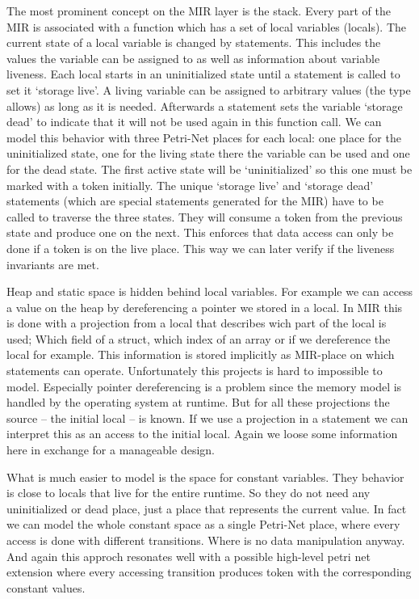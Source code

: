 The most prominent concept on the MIR layer is the stack.
Every part of the MIR is associated with a function which has a set of local variables (locals).
The current state of a local variable is changed by statements.
This includes the values the variable can be assigned to as well as information about variable liveness.
Each local starts in an uninitialized state until a statement is called to set it `storage live'.
A living variable can be assigned to arbitrary values (the type allows) as long as it is needed.
Afterwards a statement sets the variable `storage dead' to indicate that it will not be used again in this function call.
We can model this behavior with three Petri-Net places for each local: one place for the uninitialized state, one for the living state there the variable can be used and one for the dead state.
The first active state will be `uninitialized' so this one must be marked with a token initially.
The unique `storage live' and `storage dead' statements (which are special statements generated for the MIR) have to be called to traverse the three states.
They will consume a token from the previous state and produce one on the next.
This enforces that data access can only be done if a token is on the live place.
This way we can later verify if the liveness invariants are met.

Heap and static space is hidden behind local variables.
For example we can access a value on the heap by dereferencing a pointer we stored in a local.
In MIR this is done with a projection from a local that describes wich part of the local is used;
Which field of a struct, which index of an array or if we dereference the local for example.
This information is stored implicitly as MIR-place on which statements can operate.
Unfortunately this projects is hard to impossible to model.
Especially pointer dereferencing is a problem since the memory model is handled by the operating system at runtime.
But for all these projections the source -- the initial local -- is known.
If we use a projection in a statement we can interpret this as an access to the initial local.
Again we loose some information here in exchange for a manageable design.

What is much easier to model is the space for constant variables.
They behavior is close to locals that live for the entire runtime.
So they do not need any uninitialized or dead place, just a place that represents the current value.
In fact we can model the whole constant space as a single Petri-Net place, where every access is done with different transitions.
Where is no data manipulation anyway.
And again this approch resonates well with a possible high-level petri net extension where every accessing transition produces token with the corresponding constant values.


